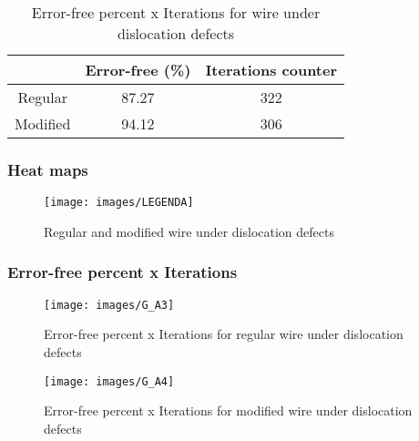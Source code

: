 \begin{table}[h]
\begin{center}
\begin{tabular}{|c|c|c|}
\hline
 & Error-free (\%) & Iterations counter \\
\hline
 Regular & 87.27 & 322 \\
\hline
 Modified & 94.12 & 306 \\
\hline

\end{tabular}
\caption{Error-free percent x Iterations for wire under dislocation defects}
\end{center}
\end{table}

\pagebreak
\subsubsection{Heat maps}

\begin{figure}[h]
\center
{}
\hfill
{}
\linebreak
{\texttt{[image: images/LEGENDA]}
}
\caption{Regular and modified wire under dislocation defects}
\label{figure:wire_t2}
\end{figure}

\subsubsection{Error-free percent x Iterations}

\begin{figure}[h!]
\center
\texttt{[image: images/G\_A3]}
\caption{Error-free percent x Iterations for regular wire under dislocation defects}
\label{figure:wire_reg_gt2}
\end{figure}


\begin{figure}[h!]
\center
\texttt{[image: images/G\_A4]}
\caption{Error-free percent x Iterations for modified wire under dislocation defects}
\label{figure:wire_mod_gt2}
\end{figure}
\pagebreak
